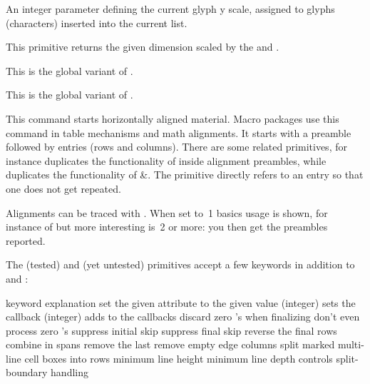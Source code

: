 \stopnewprimitive

\startnewprimitive[title={\prm {glyphyscale}}]

An integer parameter defining the current glyph y scale, assigned to glyphs
(characters) inserted into the current list.

\stopnewprimitive

\startnewprimitive[title={\prm {glyphyscaled}}]

This primitive returns the given dimension scaled by the  and
.

\stopnewprimitive

\startnewprimitive[title={\prm {gtoksapp}}]

This is the global variant of .

\stopnewprimitive

\startnewprimitive[title={\prm {gtokspre}}]

This is the global variant of .

\stopnewprimitive

\startoldprimitive[title={\prm {halign}}]

This command starts horizontally aligned material. Macro packages use this
command in table mechanisms and math alignments. It starts with a preamble
followed by entries (rows and columns). There are some related primitives, for
instance  duplicates the functionality of \type {#} inside
alignment preambles, while  duplicates the functionality of \type
{&}. The  primitive directly refers to an entry so that one
does not get repeated.

Alignments can be traced with . When set to~1 basics
usage is shown, for instance of  but more interesting is~2 or more:
you then get the preambles reported.

The  (tested) and  (yet untested) primitives accept a
few keywords in addition to  and :

\starttabulate[|l|p|]
\FL
\BC keyword             \BC explanation \NC \NR
\TL
\NC {}        \NC set the given attribute to the given value \NC \NR
\NC {}    \NC (integer) sets the  callback \NC \NR
\NC {}   \NC (integer) adds to the callbacks \NC \NR
\NC {}     \NC discard zero 's when finalizing \NC \NR
\NC {}     \NC don't even process zero 's \NC \NR
\NC {} \NC suppress initial skip \NC \NR
\NC {}  \NC suppress final skip \NC \NR
\NC {}     \NC reverse the final rows \NC \NR
\NC {}    \NC combine  in spans \NC \NR
\NC {}  \NC remove the last  \NC \NR
\NC {}       \NC remove empty edge columns \NC \NR
\HL
\NC {}       \NC split marked multi-line cell boxes into rows \NC \NR
\NC {}   \NC minimum line height \NC \NR
\NC {}    \NC minimum line depth \NC \NR
\NC {}    \NC controls split-boundary handling \NC \NR
\LL
\stoptabulate

